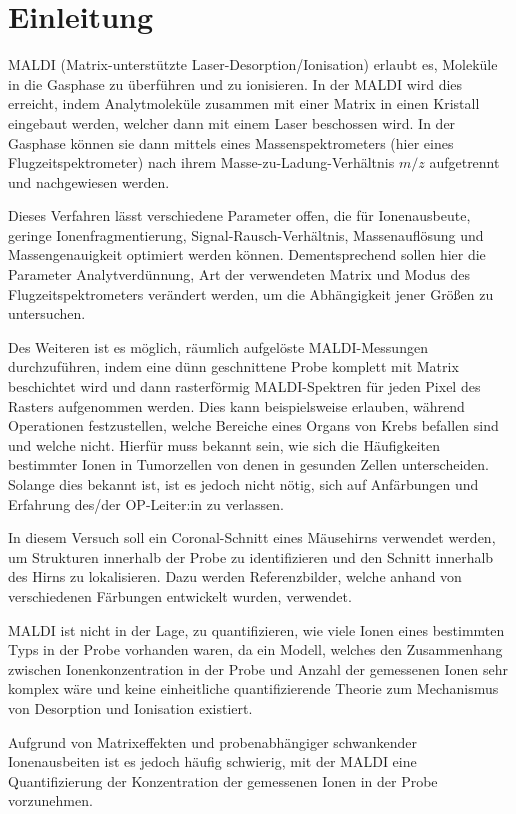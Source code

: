 \section{Einleitung}


  MALDI (Matrix-unterstützte Laser-Desorption/Ionisation) erlaubt es, Moleküle in die Gasphase zu überführen und zu ionisieren.
  In der MALDI wird dies erreicht, indem Analytmoleküle zusammen mit einer Matrix in einen Kristall eingebaut werden, welcher dann mit einem Laser beschossen wird.
  In der Gasphase können sie dann mittels eines Massenspektrometers (hier eines Flugzeitspektrometer) nach ihrem Masse-zu-Ladung-Verhältnis $m/z$ aufgetrennt und nachgewiesen werden.

  Dieses Verfahren lässt verschiedene Parameter offen, die für Ionenausbeute, geringe Ionenfragmentierung, Signal-Rausch-Verhältnis, Massenauflösung und Massengenauigkeit optimiert werden können.
  Dementsprechend sollen hier die Parameter Analytverdünnung, Art der verwendeten Matrix und Modus des Flugzeitspektrometers verändert werden, um die Abhängigkeit jener Größen zu untersuchen.

  Des Weiteren ist es möglich, räumlich aufgelöste MALDI-Messungen durchzuführen, indem eine dünn geschnittene Probe komplett mit Matrix beschichtet wird und dann rasterförmig MALDI-Spektren für jeden Pixel des Rasters aufgenommen werden.
  Dies kann beispielsweise erlauben, während Operationen festzustellen, welche Bereiche eines Organs von Krebs befallen sind und welche nicht.
  Hierfür muss bekannt sein, wie sich die Häufigkeiten bestimmter Ionen in Tumorzellen von denen in gesunden Zellen unterscheiden.
  Solange dies bekannt ist, ist es jedoch nicht nötig, sich auf Anfärbungen und Erfahrung des/der OP-Leiter:in zu verlassen.

  In diesem Versuch soll ein Coronal-Schnitt eines Mäusehirns verwendet werden, um Strukturen innerhalb der Probe zu identifizieren und den Schnitt innerhalb des Hirns zu lokalisieren.
  Dazu werden Referenzbilder, welche anhand von verschiedenen Färbungen entwickelt wurden, verwendet.

  MALDI ist nicht in der Lage, zu quantifizieren, wie viele Ionen eines bestimmten Typs in der Probe vorhanden waren, da ein Modell, welches den Zusammenhang zwischen Ionenkonzentration in der Probe und Anzahl der gemessenen Ionen sehr komplex wäre und keine einheitliche quantifizierende Theorie zum Mechanismus von Desorption und Ionisation existiert.

  Aufgrund von Matrixeffekten und probenabhängiger schwankender Ionenausbeiten ist es jedoch häufig schwierig, mit der MALDI eine Quantifizierung der Konzentration der gemessenen Ionen in der Probe vorzunehmen.
